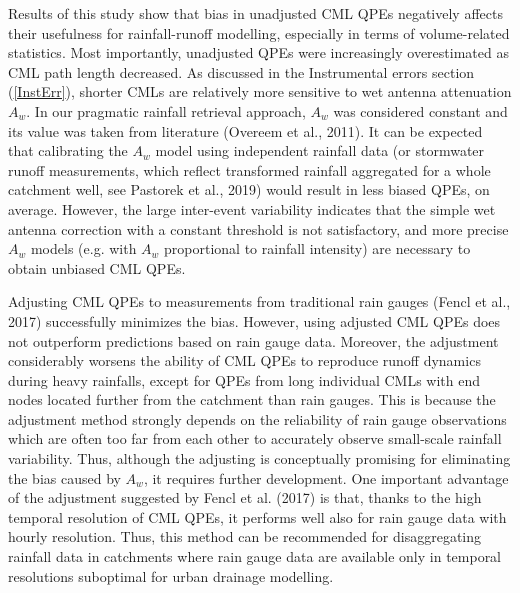 \documentclass{ctuthesis}\usepackage[]{graphicx}\usepackage[]{color}
\begin{document}
Results of this study show that bias in unadjusted CML QPEs negatively affects their usefulness for rainfall-runoff modelling, especially in terms of volume-related statistics. Most importantly, unadjusted QPEs were increasingly overestimated as CML path length decreased. As discussed in the Instrumental errors section (\ref{InstErr}), shorter CMLs are relatively more sensitive to wet antenna attenuation $A_w$. In our pragmatic rainfall retrieval approach, $A_w$ was considered constant and its value was taken from literature (Overeem et al., 2011). It can be expected that calibrating the $A_w$ model using independent rainfall data (or stormwater runoff measurements, which reflect transformed rainfall aggregated for a whole catchment well, see Pastorek et al., 2019) would result in less biased QPEs, on average. However, the large inter-event variability indicates that the simple wet antenna correction with a constant threshold is not satisfactory, and more precise $A_w$ models (e.g. with $A_w$ proportional to rainfall intensity) are necessary to obtain unbiased CML QPEs.
 
Adjusting CML QPEs to measurements from traditional rain gauges (Fencl et al., 2017) successfully minimizes the bias. However, using adjusted CML QPEs does not outperform predictions based on rain gauge data. Moreover, the adjustment considerably worsens the ability of CML QPEs to reproduce runoff dynamics during heavy rainfalls, except for QPEs from long individual CMLs with end nodes located further from the catchment than rain gauges. This is because the adjustment method strongly depends on the reliability of rain gauge observations which are often too far from each other to accurately observe small-scale rainfall variability. Thus, although the adjusting is conceptually promising for eliminating the bias caused by $A_w$, it requires further development. One important advantage of the adjustment suggested by Fencl et al. (2017) is that, thanks to the high temporal resolution of CML QPEs, it performs well also for rain gauge data with hourly resolution. Thus, this method can be recommended for disaggregating rainfall data in catchments where rain gauge data are available only in temporal resolutions suboptimal for urban drainage modelling.
\end{document}
